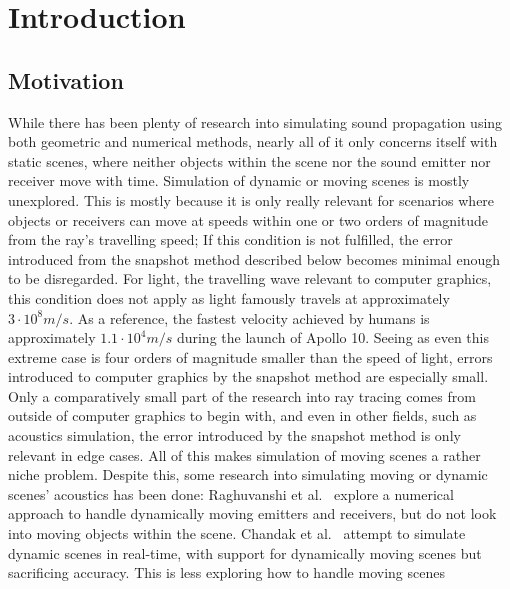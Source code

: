 \chapter{Introduction}

\section{Motivation}

While there has been plenty of research into simulating sound propagation using both geometric and numerical methods,
nearly all of it only concerns itself with static scenes,
where neither objects within the scene nor the sound emitter nor receiver move with time.
\newline
Simulation of dynamic or moving scenes is mostly unexplored.
This is mostly because it is only really relevant for scenarios
where objects or receivers can move at speeds within one or two orders of magnitude from the ray's travelling speed;
If this condition is not fulfilled,
the error introduced from the snapshot method described below becomes minimal enough to be disregarded.
\newline
For light, the travelling wave relevant to computer graphics, this condition does not apply as
light famously travels at approximately \(3 \cdot 10^{8} m/s\).
As a reference, the fastest velocity achieved by humans is approximately \(1.1 \cdot 10^4 m/s\) during the launch of Apollo 10.
Seeing as even this extreme case is four orders of magnitude smaller than the speed of light,
errors introduced to computer graphics by the snapshot method are especially small.
\newline
Only a comparatively small part of the research into ray tracing comes from outside of computer graphics to begin with,
and even in other fields, such as acoustics simulation,
the error introduced by the snapshot method is only relevant in edge cases.
All of this makes simulation of moving scenes a rather niche problem.
\newline
Despite this, some research into simulating moving or dynamic scenes' acoustics has been done:
\newline
Raghuvanshi et al.~\cite{RS10} explore a numerical approach to handle dynamically moving emitters and receivers,
but do not look into moving objects within the scene.
\newline
Chandak et al.~\cite{Cha08} attempt to simulate dynamic scenes in real-time,
with support for dynamically moving scenes but sacrificing accuracy.
This is less exploring how to handle moving scenes
